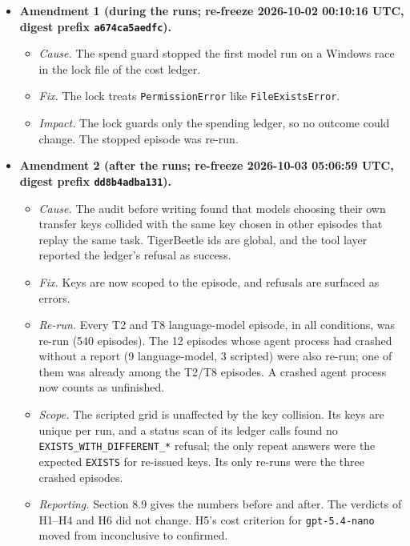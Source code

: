 \documentclass[
  10pt,
]{article}
\providecommand{\tightlist}{%
  \setlength{\itemsep}{0pt}\setlength{\parskip}{0pt}}
\begin{document}
\begin{itemize}
\tightlist
\item
  \textbf{Amendment 1 (during the runs; re-freeze 2026-10-02 00:10:16
  UTC, digest prefix \texttt{a674ca5aedfc}).}

  \begin{itemize}
  \tightlist
  \item
    \emph{Cause.} The spend guard stopped the first model run on a
    Windows race in the lock file of the cost ledger.
  \item
    \emph{Fix.} The lock treats \texttt{PermissionError} like
    \texttt{FileExistsError}.
  \item
    \emph{Impact.} The lock guards only the spending ledger, so no
    outcome could change. The stopped episode was re-run.
  \end{itemize}
\item
  \textbf{Amendment 2 (after the runs; re-freeze 2026-10-03 05:06:59
  UTC, digest prefix \texttt{dd8b4adba131}).}

  \begin{itemize}
  \tightlist
  \item
    \emph{Cause.} The audit before writing found that models choosing
    their own transfer keys collided with the same key chosen in other
    episodes that replay the same task. TigerBeetle ids are global, and
    the tool layer reported the ledger's refusal as success.
  \item
    \emph{Fix.} Keys are now scoped to the episode, and refusals are
    surfaced as errors.
  \item
    \emph{Re-run.} Every T2 and T8 language-model episode, in all
    conditions, was re-run (540 episodes). The 12 episodes whose agent
    process had crashed without a report (9 language-model, 3 scripted)
    were also re-run; one of them was already among the T2/T8 episodes.
    A crashed agent process now counts as unfinished.
  \item
    \emph{Scope.} The scripted grid is unaffected by the key collision.
    Its keys are unique per run, and a status scan of its ledger calls
    found no \texttt{EXISTS\_WITH\_DIFFERENT\_*} refusal; the only
    repeat answers were the expected \texttt{EXISTS} for re-issued keys.
    Its only re-runs were the three crashed episodes.
  \item
    \emph{Reporting.} Section 8.9 gives the numbers before and after.
    The verdicts of H1--H4 and H6 did not change. H5's cost criterion
    for \texttt{gpt-5.4-nano} moved from inconclusive to confirmed.
  \end{itemize}
\end{itemize}
\end{document}
